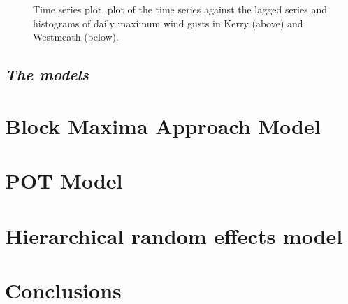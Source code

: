 \documentclass[preprint,12pt]{elsarticle}
\begin{document}
\begin{figure}[!h]
\captionsetup[subfigure]{labelformat=empty}
 \quad
{} \quad
\caption{Time series plot, plot of the time series against the lagged series and histograms of daily maximum wind gusts in Kerry (above) and Westmeath (below).}
\label{figure:Data}
\end{figure}

\subsection{\textit{The models}}



\section{Block Maxima Approach Model}
\section{POT Model}
\section{Hierarchical random effects model}
\section{Conclusions}

\clearpage
\begin{thebibliography}{99}
\end{thebibliography}
\end{document}

